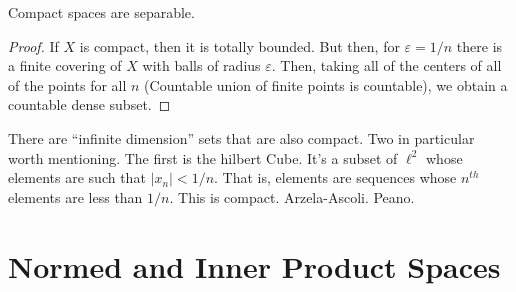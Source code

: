                \begin{theorem}
                    Compact spaces are separable.
                \end{theorem}
                \begin{proof}
                    If $X$ is compact, then
                    it is totally bounded. But
                    then, for $\varepsilon=1/n$
                    there is a finite covering of
                    $X$ with balls of radius
                    $\varepsilon$. Then,
                    taking all of the
                    centers of all of the points
                    for all $n$ (Countable union
                    of finite points is countable),
                    we obtain a countable dense
                    subset.
                \end{proof}
                \begin{example}
                    There are ``infinite dimension''
                    sets that are also compact. Two
                    in particular worth mentioning.
                    The first is the hilbert Cube.
                    It's a subset of $\ell^{2}$
                    whose elements are such that
                    $|x_{n}|<1/n$. That is, elements
                    are sequences whose $n^{th}$
                    elements are less than
                    $1/n$. This is compact.
                    Arzela-Ascoli. Peano.
                \end{example}
    \section{Normed and Inner Product Spaces}

